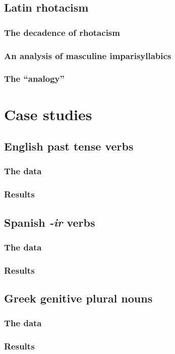 \documentclass{upenndiss}
\begin{document}
\subsection{Latin rhotacism}
\subsubsection{The decadence of rhotacism}
\subsubsection{An analysis of masculine imparisyllabics}
\subsubsection{The ``analogy''}
\section{Case studies}
\subsection{English past tense verbs}
\subsubsection{The data}
\subsubsection{Results}
\subsection{Spanish \emph{-ir} verbs}
\subsubsection{The data}
\subsubsection{Results}
\subsection{Greek genitive plural nouns}
\subsubsection{The data}
\subsubsection{Results}
\end{document}
